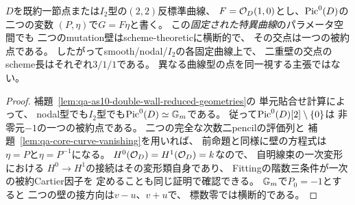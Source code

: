 \begin{corollary}
\label{cor:qa-as10-singular-double-wall-transversality}
$D$を既約一節点または$I_2$型の$(2,2)$反標準曲線、
$F=\mathcal O_D(1,0)$とし、$\operatorname{Pic}^0(D)$の二つの変数
$(P,\eta)$で$G=F\eta$と書く。
この\emph{固定された特異曲線}のパラメータ空間でも
二つのmutation壁はscheme-theoreticに横断的で、
その交点は一つの被約点である。
したがってsmooth/nodal/$I_2$の各固定曲線上で、
二重壁の交点のscheme長はそれぞれ$3/1/1$である。
異なる曲線型の点を同一視する主張ではない。
\end{corollary}
\begin{proof}
補題~\ref{lem:qa-as10-double-wall-reduced-geometries}の
単元貼合せ計算によって、
nodal型でも$I_2$型でも$\operatorname{Pic}^0(D)\simeq\mathbb G_m$である。
従って$\operatorname{Pic}^0(D)[2]\setminus\{0\}$は
非零元$-1$の一つの被約点である。
二つの完全な次数二pencilの評価列と
補題~\ref{lem:qa-core-curve-vanishing}を用いれば、
前命題と同様に壁の方程式は
$\eta=P$と$\eta=P^{-1}$になる。
$H^0(\mathcal O_D)=H^1(\mathcal O_D)=k$なので、
自明線束の一次変形における
$H^0\to H^1$の接続はその変形類自身であり、
Fittingの階数三条件が一次の被約Cartier因子を
定めることも同じ証明で確認できる。
$\mathbb G_m$で$P_0=-1$とすると
二つの壁の接方向は$v-u$、$v+u$で、
標数零では横断的である。
\end{proof}

